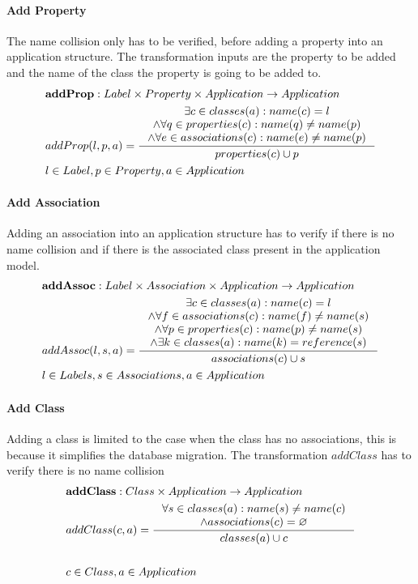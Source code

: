 \documentclass[11pt]{article}
\begin{document}
\paragraph{Add Property} The name collision only has to be verified, before adding a property into an application structure. The transformation inputs are the property to be added and the name of the class the property is going to be added to.
\begin{align*}
& 	\mathbf{addProp} : Label \times Property \times Application \rightarrow Application \\
&	addProp(l, p, a) = \inference{\exists c \in classes(a) : name(c) = l \\ \wedge \forall q \in  properties(c) : name(q) \neq name(p) \\ \wedge \forall e \in associations(c) : name(e) \neq name(p)}{properties(c) \cup p } \\
&	l \in Label, p \in Property, a \in Application
\end{align*}

\paragraph{Add Association} Adding an association into an application structure has to verify if there is no name collision and if there is the associated class present in the application model. 
\begin{align*}
&	\mathbf{addAssoc} : Label \times Association \times Application \rightarrow Application \\
&	addAssoc(l, s, a) = \inference{
	\exists c \in classes(a) : name(c) = l \\
	\wedge \forall f \in associations(c) : name(f) \neq name(s) \\ 	\wedge \forall p \in properties(c) : name(p) \neq name(s) \\ 
	\wedge \exists k \in classes(a) : name(k) = reference(s)}{associations(c) \cup s}\\
&	l \in Labels, s \in Associations, a \in Application
\end{align*}

\paragraph{Add Class} Adding a class is limited to the case when the class has no associations, this is because it simplifies the database migration. The transformation $addClass$ has to verify there is no name collision
\begin{align*}
&	\mathbf{addClass} : Class \times Application \rightarrow Application \\ 
&	addClass(c, a) = \inference{\forall s \in classes(a) : name(s) \neq name(c) \\ \wedge associations(c) = \varnothing }{classes(a) \cup c} \\ \\
&	c \in Class, a \in Application
\end{align*}
\end{document}
